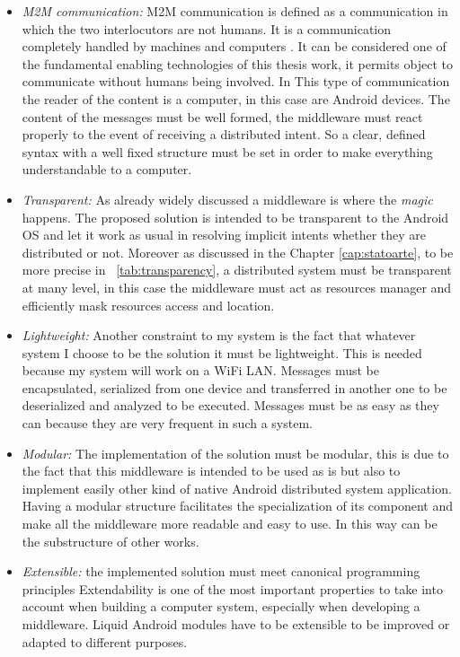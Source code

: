 \begin{itemize}
	\item \textit{M2M communication:} M2M communication is defined as a communication in which the two interlocutors are not humans. It is a communication completely handled by machines and computers \cite{cha2009trust}. It can be considered one of the fundamental enabling technologies of this thesis work, it permits object to communicate without humans being involved. In This type of communication the reader of the content is a computer, in this case are Android devices. The content of the messages must be well formed, the middleware must react properly to the event of receiving a distributed intent. So a clear, defined syntax with a well fixed structure  must be set in order to make everything understandable to a computer.
	
	\item \textit{Transparent:} As already widely discussed a middleware is where the \textit{magic} happens. The proposed solution is intended to be transparent to the Android OS and let it work as usual in resolving implicit intents whether they are distributed or not. Moreover as discussed in the Chapter \ref{cap:statoarte}, to be more precise in \tablename~\ref{tab:transparency}, a distributed system must be transparent at many level, in this case the middleware must act as resources manager and efficiently mask resources access and location.
	
	
	\item \textit{Lightweight:} Another constraint to my system is the fact that whatever system I choose to be the solution it must be lightweight. This is needed because my system will work on a WiFi LAN. Messages must be encapsulated, serialized from one device and transferred in another one to be deserialized and analyzed to be executed. Messages must be as easy as they can because they are very frequent in such a system.
	
	\item \textit{Modular:} The implementation of the solution must be modular, this is due to the fact that this middleware is intended to be used as is but also to implement easily other kind of native Android distributed system application. Having a modular structure facilitates the specialization of its component and make all the middleware more readable and easy to use. In this way  can be the substructure of other works.
	
	\item \textit{Extensible:} the implemented solution must meet canonical programming principles Extendability is one of the most important properties to take into account when building a computer system, especially when developing a middleware. Liquid Android modules have to be extensible to be improved or adapted to different purposes.
		

\end{itemize}
